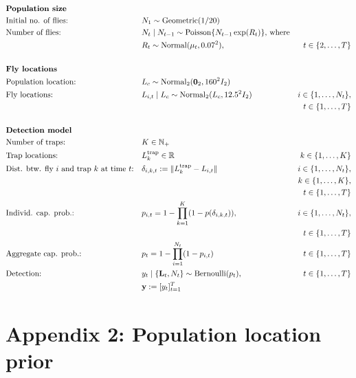 \documentclass[
  oneside]{book}
\begin{document}
\[
\renewcommand{\baselinestretch}{1}\normalsize
\begin{aligned}
&\textbf{Population size} \\
&\text{Initial no. of flies:} && N_1  \sim \mathrm{Geometric}(1/20) \\
& \text{Number of flies:}~ && N_t \mid N_{t-1}  \sim \mathrm{Poisson}\{ N_{t-1} \exp(R_t) \} \text{, where} \\ & && R_t \sim \mathrm{Normal}(\mu_t, 0.07^2), & t \in \{2, \ldots, T \} \\
\\
&\textbf{Fly locations} \\
& \text{Population location:} ~ && L_c \sim \mathrm{Normal_2}(\mathbf 0_2, 160^2 I_2) \\
& \text{Fly locations:}~ && L_{i,t} \mid L_c \sim \mathrm{Normal}_2(L_c, 12.5^2 I_2) & i \in \{1, \ldots, N_t\}, \\
  &&&& t \in \{1, \ldots, T\}\\
\\
&\textbf{Detection model} \\
& \text{Number of traps:}~ && K \in \mathbb N_+ \\
& \text{Trap locations:}~ && L_k^\text{trap} \in \mathbb R & k \in \{1, \ldots, K\} \\
& \text{Dist. btw. fly } i \text{ and trap } k \text{ at time } t \text{:} && \delta_{i,k,t} := \lVert L_k^\text{trap} - L_{i,t} \rVert & i \in \{1, \ldots, N_t\}, \\
  &&&& k \in \{1, \ldots, K\}, \\
  &&&& t \in \{1, \ldots, T\}\\
& \text{Individ. cap. prob.:} && p_{i, t} = 1 - \prod_{k=1}^K (1 - p(\delta_{i,k,t})), & i \in \{1, \ldots, N_t\}, \\
  &&&& t \in \{1, \ldots, T\} \\
& \text{Aggregate cap. prob.:} && p_t = 1 - \prod_{i=1}^{N_t} (1 - p_{i,t}) & t \in \{1, \ldots, T\} \\
&\text{Detection:}~ && y_t \mid \{ \mathbf L_t, N_t \} \sim \operatorname{Bernoulli}(p_t), & t \in \{1, \ldots, T\} \\
  &&& \mathbf y := [y_t]_{t=1}^T
\end{aligned}
\renewcommand{\baselinestretch}{1}\normalsize
\]

\hypertarget{appendix-2-population-location-prior}{%
\section{Appendix 2: Population location prior}\label{appendix-2-population-location-prior}}
\end{document}
